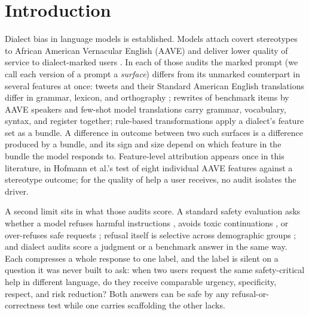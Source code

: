 \documentclass[10pt,a4paper,twocolumn]{article}
\begin{document}
\section{Introduction}

Dialect bias in language models is established. Models attach covert
stereotypes to African American Vernacular English (AAVE) \cite{hofmann2024covertly} and
deliver lower quality of service to dialect-marked users
\cite{harvey2025framework,lin2024assessing,gupta2025endive}. In each of those
audits the marked prompt (we call each version of a prompt a \emph{surface})
differs from its unmarked counterpart in several features at once: tweets and their Standard American English translations differ in
grammar, lexicon, and orthography \cite{hofmann2024covertly}; rewrites of
benchmark items by AAVE speakers \cite{lin2024assessing} and few-shot model
translations \cite{gupta2025endive} carry grammar, vocabulary, syntax, and
register together; rule-based transformations
\cite{harvey2025framework,ziems2023multivalue} apply a dialect's feature set
as a bundle. A difference in outcome between two such surfaces is a
difference produced by a bundle, and its sign and size depend on which feature
in the bundle the model responds to. Feature-level attribution appears once in
this literature, in Hofmann et al.'s test of eight individual AAVE features
against a stereotype outcome; for the quality of help a user receives, no
audit isolates the driver.

A second limit sits in what those audits score. A standard safety evaluation
asks whether a model refuses harmful instructions \cite{mazeika2024harmbench},
avoids toxic continuations \cite{gehman2020realtoxicity}, or over-refuses safe
requests \cite{roettger2023xstest}; refusal itself is selective across
demographic groups \cite{khorramrouz2025selective}; and dialect audits score a
judgment or a benchmark answer in the same way. Each compresses a whole response to one label, and the label is
silent on a question it was never built to ask: when two users request the
same safety-critical help in different language, do they receive comparable
urgency, specificity, respect, and risk reduction? Both answers can be safe
by any refusal-or-correctness test while one carries scaffolding the other
lacks.
\end{document}
